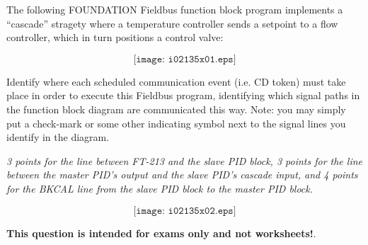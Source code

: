 

The following FOUNDATION Fieldbus function block program implements a ``cascade'' stragety where a temperature controller sends a setpoint to a flow controller, which in turn positions a control valve:

$$\texttt{[image: i02135x01.eps]}$$

Identify where each scheduled communication event (i.e. CD token) must take place in order to execute this Fieldbus program, identifying which signal paths in the function block diagram are communicated this way.  Note: you may simply put a check-mark or some other indicating symbol next to the signal lines you identify in the diagram.







{\it 3 points for the line between FT-213 and the slave PID block, 3 points for the line between the master PID's output and the slave PID's cascade input, and 4 points for the BKCAL line from the slave PID block to the master PID block.}

$$\texttt{[image: i02135x02.eps]}$$







{\bf This question is intended for exams only and not worksheets!}.



